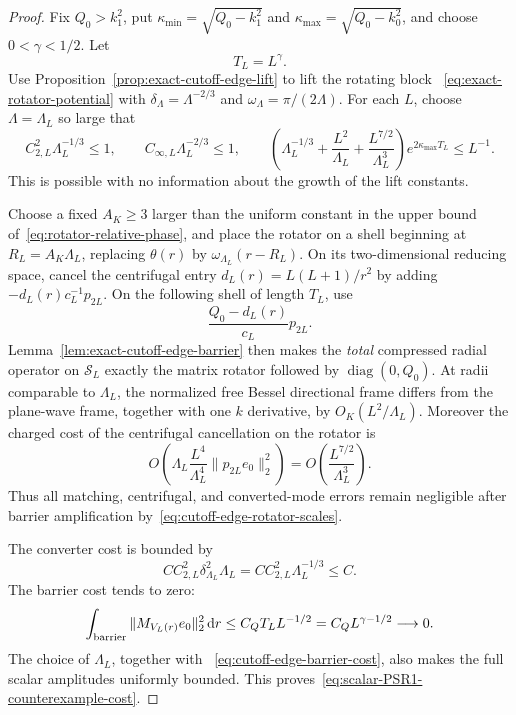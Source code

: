 \documentclass[11pt]{article}
\newcommand{\dd}{\,\mathrm d}
\DeclareMathOperator{\diag}{diag}
\theoremstyle{definition}
\theoremstyle{remark}
\begin{document}
\begin{proof}
Fix $Q_0>k_1^2$, put
$\kappa_{\min}=\sqrt{Q_0-k_1^2}$ and
$\kappa_{\max}=\sqrt{Q_0-k_0^2}$, and choose
$0<\gamma<1/2$.  Let
\begin{equation}
 T_L=L^\gamma.
 \label{eq:cutoff-edge-barrier-length}
\end{equation}
Use Proposition~\ref{prop:exact-cutoff-edge-lift} to lift the rotating block
~\eqref{eq:exact-rotator-potential} with
$\delta_\Lambda=\Lambda^{-2/3}$ and
$\omega_\Lambda=\pi/(2\Lambda)$.  For each $L$, choose $\Lambda=\Lambda_L$
so large that
\begin{equation}
 C_{2,L}^2\Lambda_L^{-1/3}\leq1,
 \qquad
 C_{\infty,L}\Lambda_L^{-2/3}\leq1,
 \qquad
 \left(\Lambda_L^{-1/3}+\frac{L^2}{\Lambda_L}
       +\frac{L^{7/2}}{\Lambda_L^3}\right)
 e^{2\kappa_{\max}T_L}\leq L^{-1}.
 \label{eq:cutoff-edge-rotator-scales}
\end{equation}
This is possible with no information about the growth of the lift constants.

Choose a fixed $A_K\geq3$ larger than the uniform constant in the upper bound
of~\eqref{eq:rotator-relative-phase}, and place the rotator on a shell beginning
at $R_L=A_K\Lambda_L$, replacing $\theta(r)$ by
$\omega_{\Lambda_L}(r-R_L)$.  On its
two-dimensional reducing space, cancel the centrifugal entry
$d_L(r)=L(L+1)/r^2$ by adding
$-d_L(r)c_L^{-1}p_{2L}$.  On the following shell of length $T_L$, use
\begin{equation}
 \frac{Q_0-d_L(r)}{c_L}p_{2L}.
 \label{eq:cutoff-edge-physical-barrier}
\end{equation}
Lemma~\ref{lem:exact-cutoff-edge-barrier} then makes the \emph{total}
compressed radial operator on $\mathcal S_L$ exactly the matrix rotator
followed by $\diag(0,Q_0)$.  At radii comparable to $\Lambda_L$, the normalized
free Bessel directional frame differs from the plane-wave frame, together with
one $k$ derivative, by $O_K(L^2/\Lambda_L)$.  Moreover the charged cost of the
centrifugal cancellation on the rotator is
\begin{equation}
 O\!\left(\Lambda_L\frac{L^4}{\Lambda_L^4}
                 \|p_{2L}e_0\|_2^2\right)
 =O\!\left(\frac{L^{7/2}}{\Lambda_L^3}\right).
 \label{eq:cutoff-edge-centrifugal-cost}
\end{equation}
Thus all matching, centrifugal, and converted-mode errors remain negligible
after barrier amplification by~\eqref{eq:cutoff-edge-rotator-scales}.

The converter cost is bounded by
\begin{equation}
 C C_{2,L}^2\delta_{\Lambda_L}^2\Lambda_L
 =C C_{2,L}^2\Lambda_L^{-1/3}\leq C.
 \label{eq:cutoff-edge-converter-cost}
\end{equation}
The barrier cost tends to zero:
\begin{equation}
 \int_{\rm barrier}\|M_{V_L(r)}e_0\|_2^2\dd r
 \leq C_QT_LL^{-1/2}
 =C_QL^{\gamma-1/2}\longrightarrow0.
 \label{eq:cutoff-edge-total-barrier-cost}
\end{equation}
The choice of $\Lambda_L$, together with
~\eqref{eq:cutoff-edge-barrier-cost}, also makes the full scalar amplitudes
uniformly bounded.  This proves~\eqref{eq:scalar-PSR1-counterexample-cost}.


\end{proof}
\end{document}
